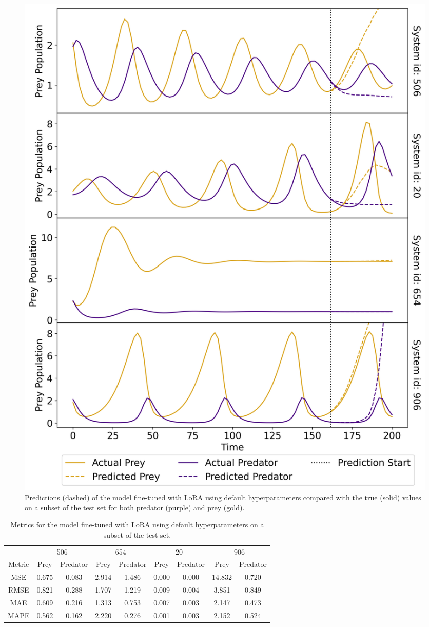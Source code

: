 \documentclass[11pt,a4paper]{article}
\begin{document}
\begin{figure}
    \centering
    \includegraphics[width=\columnwidth, keepaspectratio]{../plots/predictions_lora_default.png}
    \caption{Predictions (dashed) of the model fine-tuned with LoRA using default hyperparameters compared with the true (solid) values on a subset of the test set for both predator (purple) and prey (gold).}
    \label{fig:lora_default_pred}
\end{figure}
\clearpage
\begin{table}
    \centering
    \begin{tabular}{c|c|c|c|c|c|c|c|c}
        & \multicolumn{2}{c|}{506} & \multicolumn{2}{c|}{654} & \multicolumn{2}{c|}{20} & \multicolumn{2}{|c}{906} \\
        Metric & Prey & Predator & Prey & Predator & Prey & Predator & Prey & Predator \\
        \hline
        MSE & 0.675 & 0.083 & 2.914 & 1.486 & 0.000 & 0.000 & 14.832 & 0.720 \\
        RMSE & 0.821 & 0.288 & 1.707 & 1.219 & 0.009 & 0.004 & 3.851 & 0.849 \\
        MAE & 0.609 & 0.216 & 1.313 & 0.753 & 0.007 & 0.003 & 2.147 & 0.473 \\
        MAPE & 0.562 & 0.162 & 2.220 & 0.276 & 0.001 & 0.003 & 2.152 & 0.524 \\
    \end{tabular}
    \caption{Metrics for the model fine-tuned with LoRA using default hyperparameters on a subset of the test set.}
    \label{tab:lora_default_metrics}
\end{table}
\end{document}
